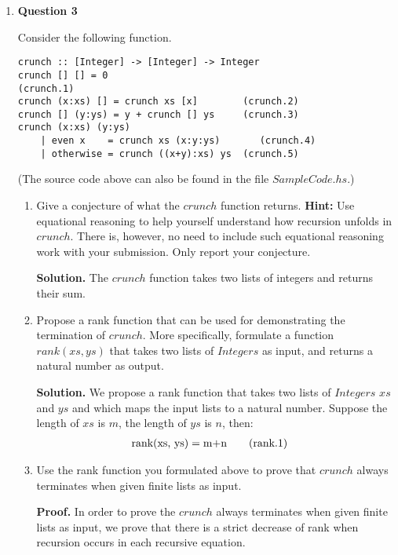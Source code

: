\documentclass[11pt]{article}
\theoremstyle{definition}
\begin{document}
\begin{enumerate} \itemsep 20pt

\item[] \textbf{Question 3}

Consider the following function.
\begin{verbatim}
crunch :: [Integer] -> [Integer] -> Integer
crunch [] [] = 0 						                      (crunch.1)
crunch (x:xs) [] = crunch xs [x]        (crunch.2)
crunch [] (y:ys) = y + crunch [] ys     (crunch.3)
crunch (x:xs) (y:ys)
    | even x	= crunch xs (x:y:ys)       (crunch.4)
    | otherwise = crunch ((x+y):xs) ys  (crunch.5)
\end{verbatim}

(The source code above can also be found in the file $SampleCode.hs.$)

\begin{enumerate}
  \item Give a conjecture of what the $crunch$ function returns. \textbf{Hint:} Use equational reasoning to help yourself 
  understand how recursion unfolds in $crunch$. There is, however, no need to include such equational reasoning work 
  with your submission. Only report your conjecture.

  \textbf{Solution.} The $crunch$ function takes two lists of integers and returns their sum.

  \item Propose a rank function that can be used for demonstrating the termination of $crunch$. More specifically, 
  formulate a function $rank(xs, ys)$ that takes two lists of $Integers$ as input, and returns a natural number as output.

  \textbf{Solution.} We propose a rank function that takes two lists of $Integers$ $xs$ and $ys$ and which maps the input
  lists to a natural number. Suppose the length of $xs$ is $m$, the length of $ys$ is $n$, then:
  \begin{align*} 
  \text{rank(xs, ys)} &= \text{m+n}           \tag{\text{rank.1}}
  \end{align*}

	\item Use the rank function you formulated above to prove that $crunch$ always terminates when given finite lists as input.

  \textbf{Proof.} 
  In order to prove the $crunch$ always terminates when given finite lists as input, we prove that there is a strict
  decrease of rank when recursion occurs in each recursive equation.


\end{enumerate}
\end{enumerate}
\end{document}
